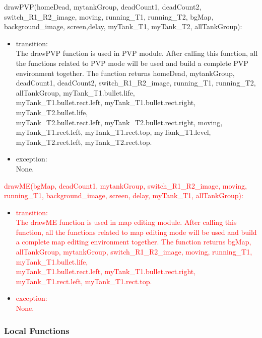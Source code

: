 \documentclass[12pt, titlepage]{article}
\begin{document}
	    drawPVP(homeDead, mytankGroup, deadCount1, deadCount2, switch\_R1\_R2\_image, moving, running\_T1, running\_T2, bgMap, background\_image, screen,delay, myTank\_T1, myTank\_T2, allTankGroup):
	    \begin{itemize}
	    \item transition:\\
	    The drawPVP function is used in PVP module. After calling this function, all the functions related to PVP mode will be used and build a complete PVP environment together. The function returns homeDead, mytankGroup, deadCount1, deadCount2, switch\_R1\_R2\_image, running\_T1, running\_T2, allTankGroup, myTank\_T1.bullet.life, \\myTank\_T1.bullet.rect.left, myTank\_T1.bullet.rect.right, myTank\_T2.bullet.life, \\ myTank\_T2.bullet.rect.left, myTank\_T2.bullet.rect.right, moving, \\myTank\_T1.rect.left, myTank\_T1.rect.top, myTank\_T1.level, myTank\_T2.rect.left, myTank\_T2.rect.top.\\
	    
	    \item exception:\\ None.
	    \end{itemize}
	    
	    \textcolor{red}{drawME(bgMap, deadCount1, mytankGroup, switch\_R1\_R2\_image, moving, running\_T1, background\_image, screen, delay, myTank\_T1, allTankGroup):}
	    \begin{itemize}
	    \item \textcolor{red}{transition:}\\
	    \textcolor{red}{The drawME function is used in map editing module. After calling this function, all the functions related to map editing mode will be used and build a complete map editing environment together. The function returns bgMap, allTankGroup, mytankGroup, switch\_R1\_R2\_image, moving, running\_T1, myTank\_T1.bullet.life, \\myTank\_T1.bullet.rect.left, myTank\_T1.bullet.rect.right, myTank\_T1.rect.left, myTank\_T1.rect.top.}\\
	    
	    \item \textcolor{red}{exception:}\\ \textcolor{red}{None.}
	    \end{itemize}
	    
	    \subsubsection{Local Functions}
	    
\end{document}
